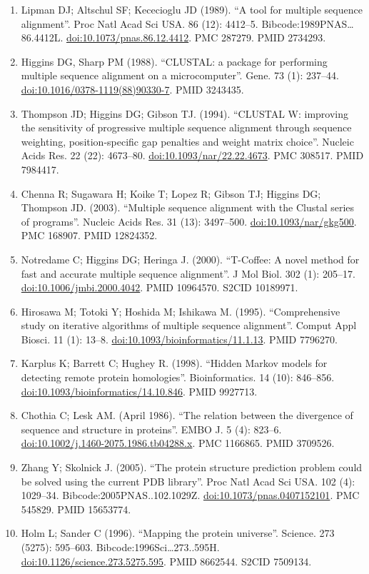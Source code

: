 \documentclass[
]{book}
\begin{document}
\begin{enumerate}
\item
  Lipman DJ; Altschul SF; Kececioglu JD (1989). ``A tool for multiple sequence alignment''. Proc Natl Acad Sci USA. 86 (12): 4412--5. Bibcode:1989PNAS\ldots86.4412L. \url{doi:10.1073/pnas.86.12.4412}. PMC 287279. PMID 2734293.
\item
  Higgins DG, Sharp PM (1988). ``CLUSTAL: a package for performing multiple sequence alignment on a microcomputer''. Gene. 73 (1): 237--44. \url{doi:10.1016/0378-1119(88)90330-7}. PMID 3243435.
\item
  Thompson JD; Higgins DG; Gibson TJ. (1994). ``CLUSTAL W: improving the sensitivity of progressive multiple sequence alignment through sequence weighting, position-specific gap penalties and weight matrix choice''. Nucleic Acids Res. 22 (22): 4673--80. \url{doi:10.1093/nar/22.22.4673}. PMC 308517. PMID 7984417.
\item
  Chenna R; Sugawara H; Koike T; Lopez R; Gibson TJ; Higgins DG; Thompson JD. (2003). ``Multiple sequence alignment with the Clustal series of programs''. Nucleic Acids Res. 31 (13): 3497--500. \url{doi:10.1093/nar/gkg500}. PMC 168907. PMID 12824352.
\item
  Notredame C; Higgins DG; Heringa J. (2000). ``T-Coffee: A novel method for fast and accurate multiple sequence alignment''. J Mol Biol. 302 (1): 205--17. \url{doi:10.1006/jmbi.2000.4042}. PMID 10964570. S2CID 10189971.
\item
  Hirosawa M; Totoki Y; Hoshida M; Ishikawa M. (1995). ``Comprehensive study on iterative algorithms of multiple sequence alignment''. Comput Appl Biosci. 11 (1): 13--8. \url{doi:10.1093/bioinformatics/11.1.13}. PMID 7796270.
\item
  Karplus K; Barrett C; Hughey R. (1998). ``Hidden Markov models for detecting remote protein homologies''. Bioinformatics. 14 (10): 846--856. \url{doi:10.1093/bioinformatics/14.10.846}. PMID 9927713.
\item
  Chothia C; Lesk AM. (April 1986). ``The relation between the divergence of sequence and structure in proteins''. EMBO J. 5 (4): 823--6. \url{doi:10.1002/j.1460-2075.1986.tb04288.x}. PMC 1166865. PMID 3709526.
\item
  Zhang Y; Skolnick J. (2005). ``The protein structure prediction problem could be solved using the current PDB library''. Proc Natl Acad Sci USA. 102 (4): 1029--34. Bibcode:2005PNAS..102.1029Z. \url{doi:10.1073/pnas.0407152101}. PMC 545829. PMID 15653774.
\item
  Holm L; Sander C (1996). ``Mapping the protein universe''. Science. 273 (5275): 595--603. Bibcode:1996Sci\ldots273..595H. \url{doi:10.1126/science.273.5275.595}. PMID 8662544. S2CID 7509134.

\end{enumerate}
\end{document}
